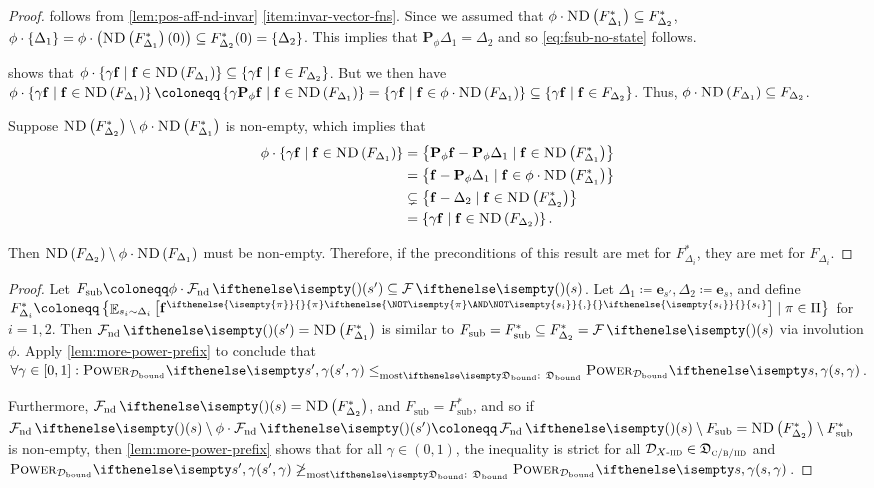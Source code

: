 \documentclass{article}
\newcommand*{\prn}[1]{\left(#1\right)}
\newcommand*{\brx}[1]{\left[#1\right]}
\renewcommand{\set}[1]{\left\{#1\right\}}
\newcommand*{\defeq}{\coloneqq} %
\newcommand*{\unitvec}[1][s]{\mathbf{e}_{#1}}
\newcommand*{\permute}[1][\phi]{\mathbf{P}_{#1}} %
\newcommand*{\upsc}[1]{\text{\upshape\textsc{#1}}}
\newcommand*{\D}{\mathcal{D}} %
\newcommand*{\distSet}{\mathfrak{D}}
\newcommand*{\DSetBCiid}{\distSet_{\textsc{c/b/}\iid}}
\newcommand*{\Dbd}{\D_{\text{bound}}}
\newcommand*{\DSetBd}{\distSet_\text{bound}}
\DeclareMathOperator*{\opE}{\mathbb{E}}
\newcommand*{\E}[2]{\opE_{#1}\brx{#2}} %
\newcommand*{\f}{\mathbf{f}} %
\newcommand*{\fpi}[2][\pi]{\f^{
\ifthenelse{\isempty{#1}}{}{#1} %
\ifthenelse{\NOT\isempty{#1} \AND \NOT\isempty{#2}}{,}{} %
\ifthenelse{\isempty{#2}}{}{#2}}} %
\newcommand*{\ND}[1]{\upsc{ND}\prn{#1}}
\theoremstyle{definition}
\begin{document}
\begin{appendices}
\begin{proof}
 follows from \cref{lem:pos-aff-nd-invar} \cref{item:invar-vector-fns}. Since we assumed that $\phi\cdot \ND{F_{\Delta_1}^*}\subseteq F_{\Delta_2}^*$, $\phi\cdot \set{\Delta_1}=\phi\cdot\prn{\ND{F_{\Delta_1}^*}(0)}\subseteq F_{\Delta_2}^*(0) =\set{\Delta_2}$. This implies that $\permute\Delta_1=\Delta_2$ and so \cref{eq:fsub-no-state} follows. 

 shows that $\phi\cdot \set{\gamma\f\mid \f \in \ND{F_{\Delta_1}}}\subseteq \set{\gamma\f\mid \f \in F_{\Delta_2}}$. But we then have $\phi\cdot \set{\gamma\f\mid \f \in \ND{F_{\Delta_1}}}\defeq \set{\gamma\permute \f \mid \f \in \ND{F_{\Delta_1}}}=\set{\gamma\f \mid \f \in \phi\cdot \ND{F_{\Delta_1}}}\subseteq \set{\gamma\f\mid \f \in F_{\Delta_2}}$. Thus,  $\phi\cdot \ND{F_{\Delta_1}}\subseteq F_{\Delta_2}$. 

Suppose $\ND{F_{\Delta_2}^*}\setminus \phi\cdot \ND{F_{\Delta_1}^*}$ is non-empty, which implies that
\begin{align}
    \phi\cdot \set{\gamma\f\mid \f \in \ND{F_{\Delta_1}}}&=\set{\permute \f - \permute\Delta_1\mid \f\in \ND{F_{\Delta_1}^*}}\\
    &=\set{\f - \permute\Delta_1\mid \f\in \phi\cdot \ND{F_{\Delta_1}^*}}\\
    &\subsetneq \set{\f-\Delta_2 \mid \f\in \ND{F_{\Delta_2}^*}}\\
    &=\set{\gamma\f\mid \f \in \ND{F_{\Delta_2}}}.
\end{align}

Then $\ND{F_{\Delta_2}}\setminus \phi\cdot \ND{F_{\Delta_1}}$ must be non-empty. Therefore, if the preconditions of this result are met for $F_{\Delta_i}^*$, they are met for $F_{\Delta_i}$.
\end{proof}

\morePowerMoreOptions*
\begin{proof}
Let $F_\text{sub}\defeq \phi\cdot \Fnd(s')\subseteq \F(s)$. Let $\Delta_1\defeq \unitvec[s'],\Delta_2\defeq \unitvec$, and define $F_{\Delta_i}^*\defeq \set{\E{s_i\sim \Delta_i}{\fpi{s_i}}\mid \pi\in\Pi}$ for $i=1,2$. Then $\Fnd(s')=\ND{F_{\Delta_1}^*}$ is similar to $F_\text{sub}=F^*_\text{sub}\subseteq F_{\Delta_2}^*=\F(s)$ via involution $\phi$. Apply \cref{lem:more-power-prefix} to conclude that  $\forall \gamma\in[0,1]:\pwr[s',\gamma][\Dbd]\leqMost[][\DSetBd] \pwr[s,\gamma][\Dbd]$. 

Furthermore, $\Fnd(s)=\ND{F_{\Delta_2}^*}$, and $F_\text{sub}=F_\text{sub}^*$, and so if $\Fnd(s)\setminus \phi\cdot \Fnd(s')\defeq \Fnd(s)\setminus F_\text{sub} =\ND{F_{\Delta_2}^*}\setminus F_\text{sub}^*$ is non-empty, then \cref{lem:more-power-prefix} shows that for all $\gamma\in(0,1)$, the inequality is strict for all $\Diid\in\DSetBCiid$ and $\pwr[s',\gamma][\Dbd]\not\geqMost[][\DSetBd] \pwr[s,\gamma][\Dbd]$. 
\end{proof}


\end{appendices}
\end{document}
